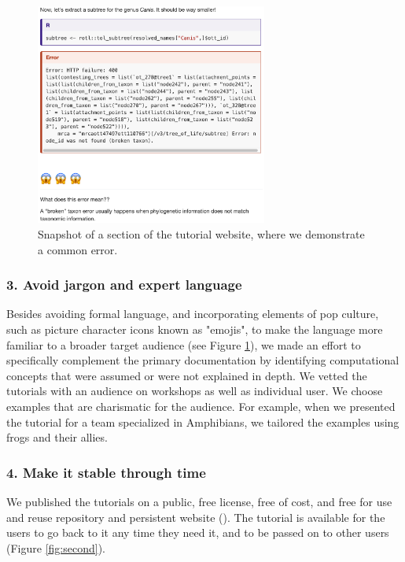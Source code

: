 \documentclass[12pt]{article}
\begin{document}
\begin{figure}
\begin{center}
\includegraphics[width=3in]{fig1.png}
\end{center}
\caption{Snapshot of a section of the tutorial website, where we demonstrate a common error. \label{fig:first}}
\end{figure}

\subsubsection*{3. Avoid jargon and expert language}

Besides avoiding formal language, and incorporating elements of pop culture, such as picture
character icons known as "emojis", to make the language more familiar to a
broader target audience (see Figure \ref{fig:first}), we made an effort to specifically
complement the primary documentation by identifying
computational concepts that were assumed or were not explained in depth.
We vetted the tutorials with an audience on workshops as well as individual user.
We choose examples that are charismatic for the audience.
For example, when we presented the tutorial for a team specialized in Amphibians,
we tailored the examples using frogs and their allies.


\subsubsection*{4. Make it stable through time}

We published the tutorials on a public, free license, free of cost, and free for
use and reuse repository and persistent website (\cite{RopentreeTutorials, RopentreeTutorialsWebsite}).
The tutorial is available for the users to go back to it any time they need it,
and to be passed on to other users (Figure \ref{fig:second}).
\end{document}
